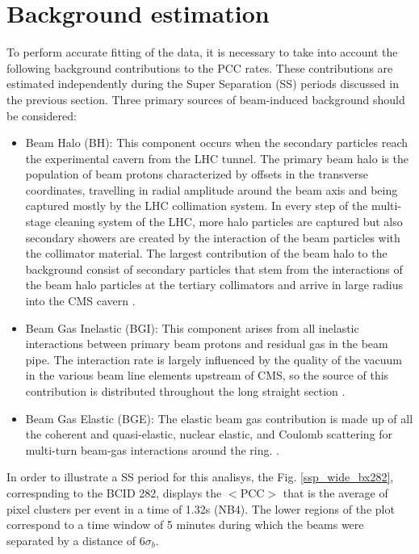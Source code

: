\section{Background estimation}
\label{bkg}
To perform accurate fitting of the data, it is necessary to take into account the following background contributions to the PCC rates. These contributions are estimated independently during the Super Separation (SS) periods discussed in the previous section. Three primary sources of beam-induced background should be considered:

\begin{itemize}

\item Beam Halo (BH): This component occurs when the secondary particles reach the experimental cavern from the LHC tunnel. The primary beam halo is  the population of beam protons characterized by offsets in the transverse coordinates, travelling in  radial amplitude around the beam axis and being captured mostly by the LHC collimation system. In every step of the multi-stage cleaning system of the LHC, more halo particles are captured but also secondary showers are created by the interaction of the beam particles with the collimator material. The largest contribution of the  beam halo to the background consist of secondary particles  that stem from the interactions of the beam halo particles at the tertiary collimators and arrive in large radius into the CMS cavern \cite{beam_halo}.

\item  Beam Gas Inelastic (BGI): This component arises from all inelastic interactions between primary beam protons and residual gas in the beam pipe. The interaction rate is largely influenced by the quality of the vacuum in the various beam line elements upstream of CMS, so the source of this contribution is distributed throughout the long straight section \cite{bkg_source}.

\item Beam Gas Elastic (BGE): The elastic beam gas contribution is made up of all the coherent and quasi-elastic, nuclear elastic, and Coulomb scattering for multi-turn beam-gas interactions around the ring.  \cite{bkg_source}.

\end{itemize}

In order to illustrate a SS period for this analisys, the Fig. \ref{ssp_wide_bx282}, correspnding to the BCID 282, displays the $<\text{PCC}>$  that is the average of pixel clusters per event in a time of 1.32s (NB4). The lower regions of the plot correspond to a time window of 5 minutes during which the beams were separated by a distance of $6\sigma_{b}$.\\

